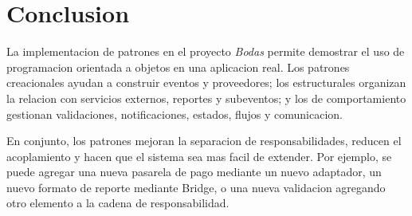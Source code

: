 \documentclass[12pt,a4paper]{article}
\begin{document}
\section{Conclusion}

La implementacion de patrones en el proyecto \textit{Bodas} permite demostrar el uso de programacion orientada a objetos en una aplicacion real. Los patrones creacionales ayudan a construir eventos y proveedores; los estructurales organizan la relacion con servicios externos, reportes y subeventos; y los de comportamiento gestionan validaciones, notificaciones, estados, flujos y comunicacion.

En conjunto, los patrones mejoran la separacion de responsabilidades, reducen el acoplamiento y hacen que el sistema sea mas facil de extender. Por ejemplo, se puede agregar una nueva pasarela de pago mediante un nuevo adaptador, un nuevo formato de reporte mediante Bridge, o una nueva validacion agregando otro elemento a la cadena de responsabilidad.
\end{document}
